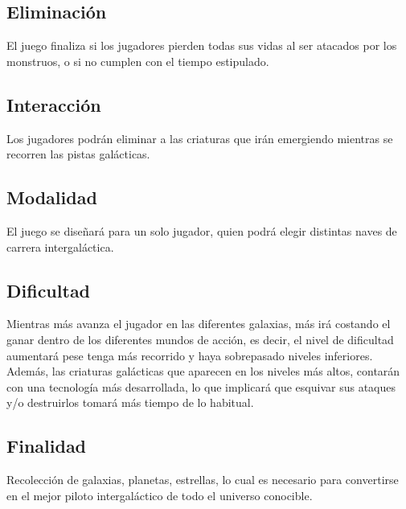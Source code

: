 \documentclass{article}
\begin{document}
\subsection{Eliminación}
El juego finaliza si los jugadores pierden todas sus vidas al ser atacados por los monstruos, o si no cumplen con el tiempo estipulado.

\subsection{Interacción}
Los jugadores podrán eliminar a las criaturas que irán emergiendo mientras se recorren las pistas galácticas.

\subsection{Modalidad}
El juego se diseñará para un solo jugador, quien podrá elegir distintas naves de carrera intergaláctica.

\subsection{Dificultad}
Mientras más avanza el jugador en las diferentes galaxias, más irá costando el ganar dentro de los diferentes mundos de acción, es decir, el nivel de dificultad aumentará pese tenga más recorrido y haya sobrepasado niveles inferiores. Además, las criaturas galácticas que aparecen en los niveles más altos, contarán con una tecnología más desarrollada, lo que implicará que esquivar sus ataques y/o destruirlos tomará más tiempo de lo habitual. 

\subsection{Finalidad}
Recolección de galaxias, planetas, estrellas, lo cual es necesario para convertirse en el mejor piloto intergaláctico de todo el universo conocible. 
\newpage



\cite{calistenia}
\end{document}
